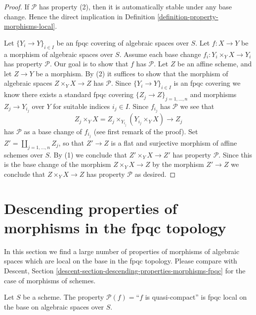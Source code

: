 \begin{proof}
If $\mathcal{P}$ has property (2), then it is automatically
stable under any base change. Hence the direct implication in
Definition \ref{definition-property-morphisms-local}.

\medskip\noindent
Let $\{Y_i \to Y\}_{i \in I}$ be an fpqc covering of algebraic spaces over $S$.
Let $f : X \to Y$ be a morphism of algebraic spaces over $S$.
Assume each base change $f_i : Y_i \times_Y X \to Y_i$ has property
$\mathcal{P}$. Our goal is to show that $f$ has $\mathcal{P}$.
Let $Z$ be an affine scheme, and let $Z \to Y$ be a morphism.
By (2) it suffices to show that the morphism of algebraic spaces
$Z \times_Y X \to Z$ has $\mathcal{P}$.
Since $\{Y_i \to Y\}_{i \in I}$ is an fpqc covering we know there
exists a standard fpqc covering $\{Z_j \to Z\}_{j = 1, \ldots , n}$
and morphisms $Z_j \to Y_{i_j}$ over $Y$ for suitable indices $i_j \in I$.
Since $f_{i_j}$ has $\mathcal{P}$ we see that
$$
Z_j \times_Y X
=
Z_j \times_{Y_{i_j}} (Y_{i_j} \times_Y X)
\longrightarrow
Z_j
$$
has $\mathcal{P}$ as a base change of $f_{i_j}$ (see first remark of the
proof). Set $Z' = \coprod_{j = 1, \ldots, n} Z_j$, so that $Z' \to Z$ is
a flat and surjective morphism of affine schemes over $S$. By (1)
we conclude that $Z' \times_Y X \to Z'$ has property $\mathcal{P}$.
Since this is the base change of the morphism $Z \times_Y X \to Z$
by the morphism $Z' \to Z$ we conclude that
$Z \times_Y X \to Z$ has property $\mathcal{P}$ as desired.
\end{proof}


\section{Descending properties of morphisms in the fpqc topology}
\label{section-descending-properties-morphisms-fpqc}


\noindent
In this section we find a large number of properties
of morphisms of algebraic spaces which are local on the base
in the fpqc topology. Please compare with
Descent, Section \ref{descent-section-descending-properties-morphisms-fpqc}
for the case of morphisms of schemes.

\begin{lemma}
\label{lemma-descending-property-quasi-compact}
Let $S$ be a scheme.
The property $\mathcal{P}(f) =$``$f$ is quasi-compact''
is fpqc local on the base on algebraic spaces over $S$.
\end{lemma}

